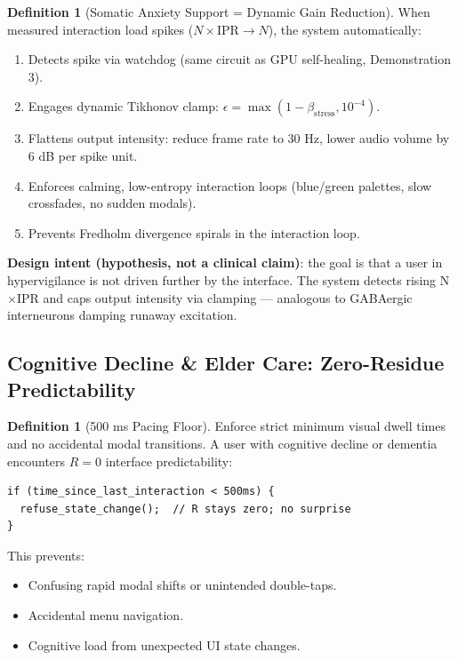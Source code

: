 \documentclass[11pt,oneside]{article}
\theoremstyle{definition}
\newtheorem{definition}[theorem]{Definition}
\begin{document}
\begin{definition}[Somatic Anxiety Support = Dynamic Gain Reduction]
When measured interaction load spikes ($N \times \text{IPR} \to N$), the system automatically:

\begin{enumerate}
  \item Detects spike via watchdog (same circuit as GPU self-healing, Demonstration 3).
  \item Engages dynamic Tikhonov clamp: $\epsilon = \max(1 - \beta_{\text{stress}}, 10^{-4})$.
  \item Flattens output intensity: reduce frame rate to 30 Hz, lower audio volume by 6 dB per spike unit.
  \item Enforces calming, low-entropy interaction loops (blue/green palettes, slow crossfades, no sudden modals).
  \item Prevents Fredholm divergence spirals in the interaction loop.
\end{enumerate}
\end{definition}

\textbf{Design intent (hypothesis, not a clinical claim)}: the goal is that a user in hypervigilance is not driven further by the interface. The system detects rising N\ensuremath{\times}IPR and caps output intensity via clamping --- analogous to GABAergic interneurons damping runaway excitation.

\subsection{Cognitive Decline \& Elder Care: Zero-Residue Predictability}

\begin{definition}[500 ms Pacing Floor]
Enforce strict minimum visual dwell times and no accidental modal transitions. A user with cognitive decline or dementia encounters $R = 0$ interface predictability:

\begin{lstlisting}
if (time_since_last_interaction < 500ms) {
  refuse_state_change();  // R stays zero; no surprise
}
\end{lstlisting}

This prevents:
\begin{itemize}
  \item Confusing rapid modal shifts or unintended double-taps.
  \item Accidental menu navigation.
  \item Cognitive load from unexpected UI state changes.
\end{itemize}
\end{definition}
\end{document}
